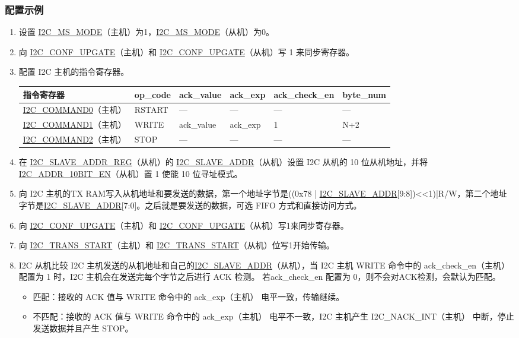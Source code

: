 \documentclass[main\_\_CN.tex]{subfiles}
\begin{document}
\subsubsection{配置示例}
\begin{enumerate}
\item 设置 \hyperref[fielddesc:I2CMSMODE]{I2C\_MS\_MODE}（主机）为1，\hyperref[fielddesc:I2CMSMODE]{I2C\_MS\_MODE}（从机）为0。
\item 向 \hyperref[fielddesc:I2CCONFUPGATE]{I2C\_CONF\_UPGATE}（主机）和 \hyperref[fielddesc:I2CCONFUPGATE]{I2C\_CONF\_UPGATE}（从机）写 1 来同步寄存器。
\item 配置 I2C 主机的指令寄存器。

\begin{longtable}{ | p{4cm} | p{2cm} | p{2cm} | p{2cm} |p{2cm} | p{2cm} |}
\hline\rowcolor{lightgray}
指令寄存器& op\_code & ack\_value&ack\_exp&ack\_check\_en&byte\_num  \\ \hline
\hyperref[fielddesc:I2CCOMMAND0]{I2C\_COMMAND0}（主机）& RSTART& ---&---&---&---  \\ \hline
\hyperref[fielddesc:I2CCOMMAND1]{I2C\_COMMAND1}（主机）& WRITE& ack\_value&ack\_exp&1&N+2  \\ \hline
\hyperref[fielddesc:I2CCOMMAND2]{I2C\_COMMAND2}（主机）& STOP& ---&---&---&---  \\ \hline
\end{longtable}

\item 在 \hyperref[regdesc:I2CSLAVEADDRREG]{I2C\_SLAVE\_ADDR\_REG}（从机）的 \hyperref[fielddesc:I2CSLAVEADDR]{I2C\_SLAVE\_ADDR}（从机）设置 I2C 从机的 10 位从机地址，并将 \hyperref[fielddesc:I2CADDR10BITEN]{I2C\_ADDR\_10BIT\_EN}（从机）置 1 使能 10 位寻址模式。
\item 向 I2C 主机的TX RAM写入从机地址和要发送的数据，第一个地址字节是((0x78 | \hyperref[fielddesc:I2CSLAVEADDR]{I2C\_SLAVE\_ADDR}[9:8])<<1)|R/W，第二个地址字节是\hyperref[fielddesc:I2CSLAVEADDR]{I2C\_SLAVE\_ADDR}[7:0]。之后就是要发送的数据，可选 FIFO 方式和直接访问方式。
\item 向 \hyperref[fielddesc:I2CCONFUPGATE]{I2C\_CONF\_UPGATE}（主机）和 \hyperref[fielddesc:I2CCONFUPGATE]{I2C\_CONF\_UPGATE}（从机）写1来同步寄存器。
\item 向 \hyperref[fielddesc:I2CTRANSSTART]{I2C\_TRANS\_START}（主机）和 \hyperref[fielddesc:I2CTRANSSTART]{I2C\_TRANS\_START}（从机）位写1开始传输。
\item I2C 从机比较 I2C 主机发送的从机地址和自己的\hyperref[fielddesc:I2CSLAVEADDR]{I2C\_SLAVE\_ADDR}（从机），当 I2C 主机 WRITE 命令中的 ack\_check\_en（主机）配置为 1 时，I2C 主机会在发送完每个字节之后进行 ACK 检测。 若ack\_check\_en 配置为 0，则不会对ACK检测，会默认为匹配。
\begin{itemize}
\item 匹配：接收的 ACK 值与 WRITE 命令中的 ack\_exp（主机） 电平一致，传输继续。
\item 不匹配：接收的 ACK 值与 WRITE 命令中的 ack\_exp（主机） 电平不一致，I2C 主机产生 I2C\_NACK\_INT（主机） 中断，停止发送数据并且产生 STOP。
\end{itemize}


\end{enumerate}
\end{document}
